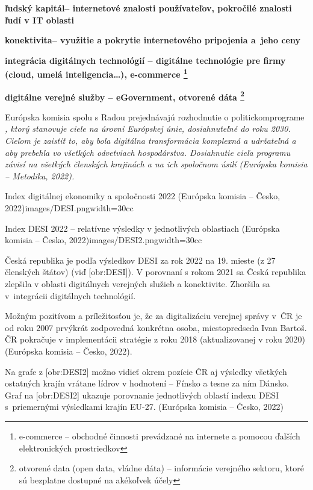 \startitemize
\item{\start\bf ľudský kapitál\stop -- internetové znalosti používateľov, pokročilé znalosti ľudí v IT oblasti}
\item{\start\bf konektivita\stop -- využitie a pokrytie internetového pripojenia a~jeho ceny}
\item{\start\bf integrácia digitálnych technológií \stop -- digitálne technológie pre firmy (cloud, umelá inteligencia\dots), e-commerce \footnote{e-commerce -- obchodné činnosti prevádzané na internete a pomocou ďalších elektronických prostriedkov}}
\item{\start\bf digitálne verejné služby \stop -- eGovernment, otvorené dáta \footnote{otvorené data (open data, vládne dáta) -- informácie verejného sektoru, ktoré sú bezplatne dostupné na akékoľvek účely}}
\stopitemize 

Európska komisia spolu s Radou prejednávajú rozhodnutie o politickom\zlom programe \start\it {} \stop, ktorý stanovuje ciele na úrovni Európskej únie, dosiahnuteľné do roku 2030. Cieľom je zaistiť to, aby bola digitálna transformácia komplexná a udržateľná a aby prebehla vo všetkých odvetviach hospodárstva. Dosiahnutie cieľa programu závisí na všetkých členských krajinách a na ich spoločnom úsilí \scr(Európska komisia -- Metodika, 2022).

{Index digitálnej ekonomiky a spoločnosti 2022 (Európska komisia -- Česko, 2022)}{images/DESI.png}{width=30cc}

{Index DESI 2022 -- relatívne výsledky v jednotlivých oblastiach (Európska komisia -- Česko, 2022)}{images/DESI2.png}{width=30cc}

Česká republika je podľa výsledkov DESI za rok 2022 na 19. mieste (z 27 členských štátov) (viď [obr:DESI]). V porovnaní s rokom 2021 sa Česká republika zlepšila v oblasti digitálnych verejných služieb a konektivite. Zhoršila sa v~integrácii digitálnych technológií.

Možným pozitívom a príležitosťou je, že za digitalizáciu verejnej správy v~ČR je od roku 2007 prvýkrát zodpovedná konkrétna osoba, miestopredseda Ivan Bartoš. ČR pokračuje v implementácii stratégie  z roku 2018 (aktualizovanej v roku 2020) \scr(Európska komisia -- Česko, 2022).

Na grafe z [obr:DESI2] možno vidieť okrem pozície ČR aj výsledky všetkých ostatných krajín vrátane lídrov v hodnotení -- Fínsko a tesne za ním Dánsko. Graf na [obr:DESI2] ukazuje porovnanie jednotlivých oblastí indexu DESI s~priemernými výsledkami krajín EU-27. \scr(Európska komisia -- Česko, 2022)

